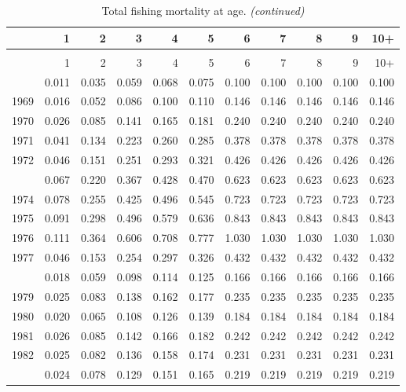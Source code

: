 \documentclass[
]{article}
\begin{document}
\begin{longtable}[t]{lrrrrrrrrrr}
\caption{\label{tab:FAA-tot-table}Total fishing mortality at age.}\\
\toprule
  & 1 & 2 & 3 & 4 & 5 & 6 & 7 & 8 & 9 & 10+\\
\midrule
\endfirsthead
\caption[]{Total fishing mortality at age. \textit{(continued)}}\\
\toprule
  & 1 & 2 & 3 & 4 & 5 & 6 & 7 & 8 & 9 & 10+\\
\midrule
\endhead

\endfoot
\bottomrule
\endlastfoot
1968 & 0.011 & 0.035 & 0.059 & 0.068 & 0.075 & 0.100 & 0.100 & 0.100 & 0.100 & 0.100\\
1969 & 0.016 & 0.052 & 0.086 & 0.100 & 0.110 & 0.146 & 0.146 & 0.146 & 0.146 & 0.146\\
1970 & 0.026 & 0.085 & 0.141 & 0.165 & 0.181 & 0.240 & 0.240 & 0.240 & 0.240 & 0.240\\
1971 & 0.041 & 0.134 & 0.223 & 0.260 & 0.285 & 0.378 & 0.378 & 0.378 & 0.378 & 0.378\\
1972 & 0.046 & 0.151 & 0.251 & 0.293 & 0.321 & 0.426 & 0.426 & 0.426 & 0.426 & 0.426\\
\addlinespace
1973 & 0.067 & 0.220 & 0.367 & 0.428 & 0.470 & 0.623 & 0.623 & 0.623 & 0.623 & 0.623\\
1974 & 0.078 & 0.255 & 0.425 & 0.496 & 0.545 & 0.723 & 0.723 & 0.723 & 0.723 & 0.723\\
1975 & 0.091 & 0.298 & 0.496 & 0.579 & 0.636 & 0.843 & 0.843 & 0.843 & 0.843 & 0.843\\
1976 & 0.111 & 0.364 & 0.606 & 0.708 & 0.777 & 1.030 & 1.030 & 1.030 & 1.030 & 1.030\\
1977 & 0.046 & 0.153 & 0.254 & 0.297 & 0.326 & 0.432 & 0.432 & 0.432 & 0.432 & 0.432\\
\addlinespace
1978 & 0.018 & 0.059 & 0.098 & 0.114 & 0.125 & 0.166 & 0.166 & 0.166 & 0.166 & 0.166\\
1979 & 0.025 & 0.083 & 0.138 & 0.162 & 0.177 & 0.235 & 0.235 & 0.235 & 0.235 & 0.235\\
1980 & 0.020 & 0.065 & 0.108 & 0.126 & 0.139 & 0.184 & 0.184 & 0.184 & 0.184 & 0.184\\
1981 & 0.026 & 0.085 & 0.142 & 0.166 & 0.182 & 0.242 & 0.242 & 0.242 & 0.242 & 0.242\\
1982 & 0.025 & 0.082 & 0.136 & 0.158 & 0.174 & 0.231 & 0.231 & 0.231 & 0.231 & 0.231\\
\addlinespace
1983 & 0.024 & 0.078 & 0.129 & 0.151 & 0.165 & 0.219 & 0.219 & 0.219 & 0.219 & 0.219\\

\end{longtable}
\end{document}
